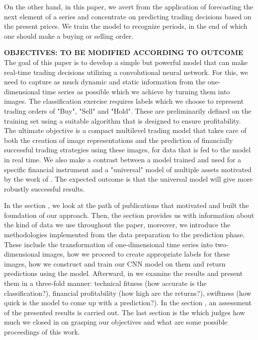 \documentclass[11pt, a4paper]{article}
\begin{document}
On the other hand, in this paper, we avert from the application of forecasting the next element of a series and concentrate on predicting trading decisions based on the present prices. We train the model to recognize periods, in the end of which one should make a buying or selling order. 

\textbf{OBJECTIVES: TO BE MODIFIED ACCORDING TO OUTCOME}
The goal of this paper is to develop a simple but powerful model that can make real-time trading decisions utilizing a convolutional neural network. For this, we need to capture as much dynamic 
and static information from the one-dimensional time series as possible which we achieve by turning them into images. The classification exercise requires labels which we choose to represent trading orders of "Buy", "Sell" and "Hold". 
These are preliminarily defined on the training set using a suitable algorithm that is designed to ensure profitability. The ultimate objective is a compact multilevel trading model that takes care of both the creation of image representations and the prediction of financially successful trading strategies using these images, for data that is fed to the model in real time. We also make a contrast between a model trained and used for a specific financial instrument and a "universal" model of multiple assets motivated by the work of \cite{sirignano2018universal}. The expected outcome is that the universal model will give more robustly successful results.

In the section , we look at the path of publications that motivated and built the foundation of our approach. Then, the section  provides us with information about the kind of data we use throughout 
the paper, moreover, we introduce the methodologies implemented from the data preparation to the prediction phase. These include the transformation of one-dimensional time series into two-dimensional images, 
how we proceed to create appropriate labels for these images, how we construct and train our CNN model on them and return predictions using the model. 
Afterward, in  we examine the results and present them in a three-fold manner:
technical fitness (how accurate is the classification?), financial profitability (how high are the returns?), swiftness (how quick is the model to come up with a prediction?). In the section , an assessment of the presented results is carried out.
The last section is the  which judges how much 
we closed in on grasping our objectives and what are some possible proceedings of this work.
\end{document}
